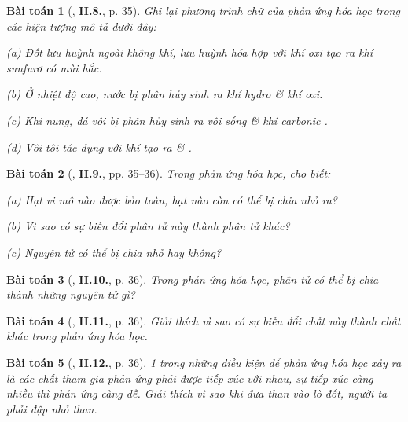 \documentclass{article}
\numberwithin{equation}{section}
\newtheorem{baitoan}{Bài toán}
\begin{document}
\begin{baitoan}[\cite{Truong2021}, \textbf{II.8.}, p. 35]
	Ghi lại phương trình chữ của phản ứng hóa học trong các hiện tượng mô tả dưới đây:
	\begin{enumerate*}
		\item[(a)] Đốt lưu huỳnh ngoài không khí, lưu huỳnh hóa hợp với khí oxi tạo ra khí sunfurơ \emph{} có mùi hắc.
		\item[(b)] Ở nhiệt độ cao, nước bị phân hủy sinh ra khí hydro \& khí oxi.
		\item[(c)] Khi nung, đá vôi \emph{} bị phân hủy sinh ra vôi sống \emph{} \& khí carbonic \emph{}.
		\item[(d)] Vôi tôi \emph{} tác dụng với khí \emph{} tạo ra \emph{} \& \emph{}.
	\end{enumerate*}
\end{baitoan}

\begin{baitoan}[\cite{Truong2021}, \textbf{II.9.}, pp. 35--36]
	Trong phản ứng hóa học, cho biết:
	\begin{enumerate*}
		\item[(a)] Hạt vi mô nào được bảo toàn, hạt nào còn có thể bị chia nhỏ ra?
		\item[(b)] Vì sao có sự biến đổi phân tử này thành phân tử khác?
		\item[(c)] Nguyên tử có thể bị chia nhỏ hay không?
	\end{enumerate*}
\end{baitoan}

\begin{baitoan}[\cite{Truong2021}, \textbf{II.10.}, p. 36]
	Trong phản ứng hóa học, phân tử \emph{} có thể bị chia thành những nguyên tử gì?
\end{baitoan}

\begin{baitoan}[\cite{Truong2021}, \textbf{II.11.}, p. 36]
	Giải thích vì sao có sự biến đổi chất này thành chất khác trong phản ứng hóa học.
\end{baitoan}

\begin{baitoan}[\cite{Truong2021}, \textbf{II.12.}, p. 36]
	1 trong những điều kiện để phản ứng hóa học xảy ra là các chất tham gia phản ứng phải được tiếp xúc với nhau, sự tiếp xúc càng nhiều thì phản ứng càng dễ. Giải thích vì sao khi đưa than vào lò đốt, người ta phải đập nhỏ than.
\end{baitoan}
\end{document}

